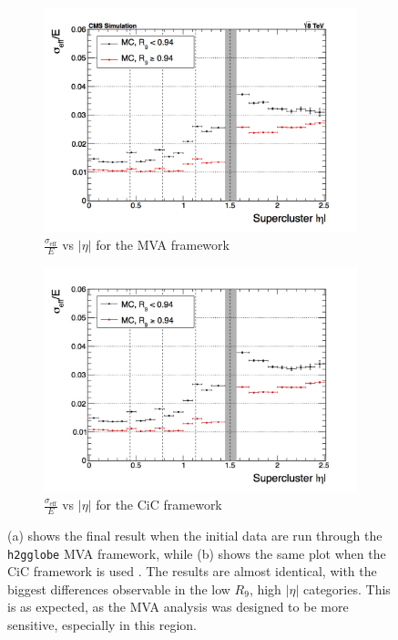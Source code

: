 \documentclass[10pt]{article}
\begin{document}
\begin{figure}[h!]
  \centering
  \begin{subfigure}{0.49\textwidth}
\includegraphics[width=\textwidth]{"EffSigma_vs_eta_mva"}
\caption{$\frac{\sigma_\text{eff}}{E}$ vs $|\eta|$ for the MVA framework}
\end{subfigure}
  \begin{subfigure}{0.49\textwidth}
  
\includegraphics[width=\textwidth]{"EffSigma_vs_eta_cic"}
\caption{$\frac{\sigma_\text{eff}}{E}$ vs $|\eta|$ for the CiC framework}
\end{subfigure}
\caption{(a) shows the final result when the initial data are run through the \texttt{h2gglobe} MVA framework, while (b) shows the same plot when the CiC framework is used . The results are almost identical, with the biggest differences observable in the low $R_9$, high $|\eta|$ categories. This is as expected, as the MVA analysis was designed to be more sensitive, especially in this region.}
\label{cicPlot}
\end{figure}
\end{document}
